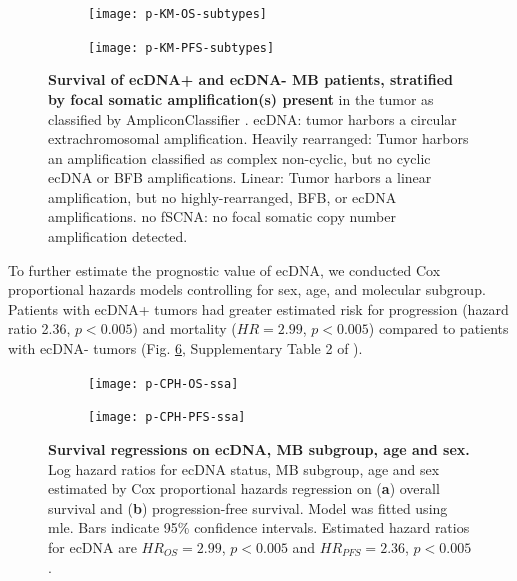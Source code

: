 \begin{figure}[!h]
    \centering
    \begin{subfigure}{0.49\textwidth}
        \centering
        \texttt{[image: p-KM-OS-subtypes]}
        \caption{}
        \label{subfig:}
    \end{subfigure}
    \begin{subfigure}{0.49\textwidth}
        \texttt{[image: p-KM-PFS-subtypes]}
        \caption{}
        \label{subfig:}
    \end{subfigure}
    \caption[Survival of ecDNA+ and ecDNA- MB patients, stratified by focal somatic amplification(s) present.]{\textbf{Survival of ecDNA+ and ecDNA- MB patients, stratified by focal somatic amplification(s) present} in the tumor as classified by AmpliconClassifier \cite{Kim_2020}. ecDNA: tumor harbors a circular extrachromosomal amplification. Heavily rearranged: Tumor harbors an amplification classified as complex non-cyclic, but no cyclic ecDNA or BFB amplifications. Linear: Tumor harbors a linear amplification, but no highly-rearranged, BFB, or ecDNA amplifications. no fSCNA: no focal somatic copy number amplification detected.}
    \label{fig:km-cna}
\end{figure}

To further estimate the prognostic value of ecDNA, we conducted Cox proportional hazards models controlling for sex, age, and molecular subgroup. Patients with ecDNA+ tumors had greater estimated risk for progression (hazard ratio 2.36, $p < 0.005$) and mortality ($HR = 2.99$, $p < 0.005$) compared to patients with ecDNA- tumors (Fig. \ref{fig:cph-ssa}, Supplementary Table 2 of \cite{Chapman}). 

\begin{figure}[!h]
    \centering
    \begin{subfigure}{0.49\textwidth}
        \centering
        \texttt{[image: p-CPH-OS-ssa]}
        \caption{}
        \label{fig:cph-os-ssa}
    \end{subfigure}
    \begin{subfigure}{0.49\textwidth}
        \texttt{[image: p-CPH-PFS-ssa]}
        \caption{}
        \label{fig:cph-pfs-ssa}
    \end{subfigure}
    \caption[Survival regressions on \gls{ecDNA}, MB subgroup, age and sex.]{\textbf{Survival regressions on \gls{ecDNA}, MB subgroup, age and sex.} Log hazard ratios for ecDNA status, MB subgroup, age and sex estimated by Cox proportional hazards regression on (\textbf{a}) overall survival and (\textbf{b}) progression-free survival. Model was fitted using \gls{mle}. Bars indicate 95\% confidence intervals. Estimated hazard ratios for ecDNA are $HR_{OS} = 2.99$, $p < 0.005$ and $HR_{PFS} = 2.36$, $p < 0.005$. }
    \label{fig:cph-ssa}
\end{figure}


